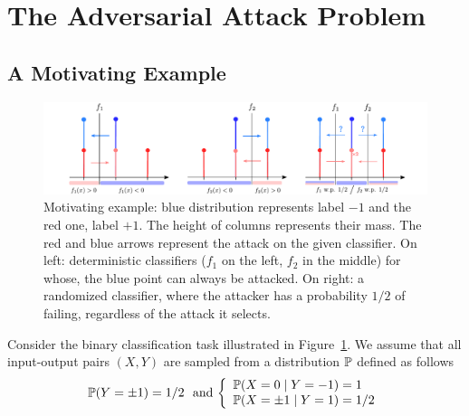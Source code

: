 
\section{The Adversarial Attack Problem}
\label{sec:adv-problem}
\subsection{A Motivating Example}
\label{sec:motiv-ex}

\begin{figure}[!ht]
    \centering
\includegraphics[width=\textwidth]{Images/Drawing-Intro-Mixte-Nash-on-a-line.pdf}   \caption{Motivating example: blue distribution represents label $-1$ and the red one, label $+1$.  The height of columns represents their mass. The red and blue arrows represent the attack on the given classifier. On left: deterministic classifiers ($f_1$ on the left, $f_2$ in the middle) for whose, the blue point can always be attacked. On right: a randomized classifier, where the attacker has a probability $1/2$ of failing, regardless of the attack it selects.  }
    \label{fig:motivating_ex}
\end{figure}
Consider the binary classification task illustrated in Figure~\ref{fig:motivating_ex}. We assume that all input-output pairs $(X,Y)$ are sampled from a distribution $\mathbb{P}$ defined as follows
$$ 
\PP\left(Y =\pm 1\right)=1/2 \ \mbox{ and }\left\{
    \begin{array}{ll}
        \PP\left(X=0 \mid Y=-1\right) = 1 \\
        \PP\left(X= \pm 1 \mid Y=1\right) = 1/2 
    \end{array}
\right.
$$ 
